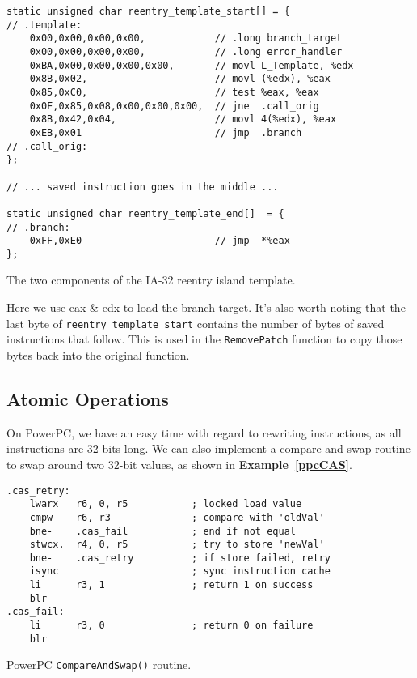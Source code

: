 \documentclass[english]{article}
\begin{document}
\begin{sourcecode}
\begin{verbatim}
static unsigned char reentry_template_start[] = {
// .template:
    0x00,0x00,0x00,0x00,            // .long branch_target
    0x00,0x00,0x00,0x00,            // .long error_handler
    0xBA,0x00,0x00,0x00,0x00,       // movl L_Template, %edx
    0x8B,0x02,                      // movl (%edx), %eax
    0x85,0xC0,                      // test %eax, %eax
    0x0F,0x85,0x08,0x00,0x00,0x00,  // jne  .call_orig
    0x8B,0x42,0x04,                 // movl 4(%edx), %eax
    0xEB,0x01                       // jmp  .branch
// .call_orig:
};

// ... saved instruction goes in the middle ...

static unsigned char reentry_template_end[]  = {
// .branch:
    0xFF,0xE0                       // jmp  *%eax
};
\end{verbatim}
\caption{The two components of the IA-32 reentry island template.}
\label{intelReentryIsland}
\end{sourcecode}

Here we use eax \& edx to load the branch target. It's also worth noting that the last byte of \texttt{reentry\_template\_start} contains the number of bytes of saved instructions that follow. This is used in the \texttt{RemovePatch} function to copy those bytes back into the original function.

\subsection{Atomic Operations}
On PowerPC, we have an easy time with regard to rewriting instructions, as all instructions are 32-bits long. We can also implement a compare-and-swap routine to swap around two 32-bit values, as shown in \textbf{Example~\ref{ppcCAS}}.

\begin{sourcecode}
\begin{verbatim}
.cas_retry:
    lwarx   r6, 0, r5           ; locked load value
    cmpw    r6, r3              ; compare with 'oldVal'
    bne-    .cas_fail           ; end if not equal
    stwcx.  r4, 0, r5           ; try to store 'newVal'
    bne-    .cas_retry          ; if store failed, retry
    isync                       ; sync instruction cache
    li      r3, 1               ; return 1 on success
    blr
.cas_fail:
    li      r3, 0               ; return 0 on failure
    blr
\end{verbatim}
\caption{PowerPC \texttt{CompareAndSwap()} routine.}
\label{ppcCAS}
\end{sourcecode}
\end{document}
